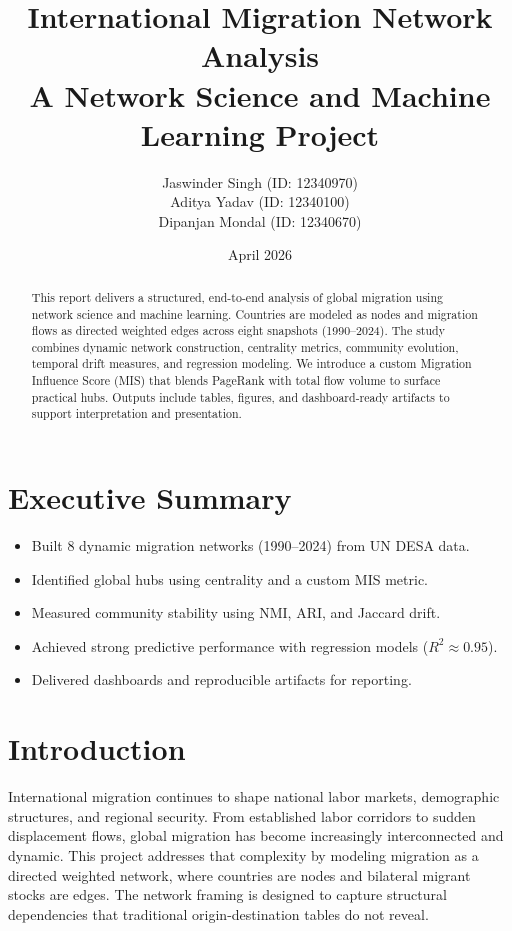 \documentclass[12pt]{report}
\title{International Migration Network Analysis\\A Network Science and Machine Learning Project}
\author{Jaswinder Singh (ID: 12340970)\\Aditya Yadav (ID: 12340100)\\Dipanjan Mondal (ID: 12340670)}
\date{April 2026}
\begin{document}
\maketitle

\begin{abstract}
This report delivers a structured, end-to-end analysis of global migration using network science and machine learning. Countries are modeled as nodes and migration flows as directed weighted edges across eight snapshots (1990--2024). The study combines dynamic network construction, centrality metrics, community evolution, temporal drift measures, and regression modeling. We introduce a custom Migration Influence Score (MIS) that blends PageRank with total flow volume to surface practical hubs. Outputs include tables, figures, and dashboard-ready artifacts to support interpretation and presentation.
\end{abstract}

\tableofcontents
\listoffigures
\listoftables
\newpage

\chapter*{Executive Summary}
\begin{itemize}
    \item Built 8 dynamic migration networks (1990--2024) from UN DESA data.
    \item Identified global hubs using centrality and a custom MIS metric.
    \item Measured community stability using NMI, ARI, and Jaccard drift.
    \item Achieved strong predictive performance with regression models ($R^2 \approx 0.95$).
    \item Delivered dashboards and reproducible artifacts for reporting.
\end{itemize}
\clearpage

\chapter{Introduction}
International migration continues to shape national labor markets, demographic structures, and regional security. From established labor corridors to sudden displacement flows, global migration has become increasingly interconnected and dynamic. This project addresses that complexity by modeling migration as a directed weighted network, where countries are nodes and bilateral migrant stocks are edges. The network framing is designed to capture structural dependencies that traditional origin-destination tables do not reveal.
\end{document}
